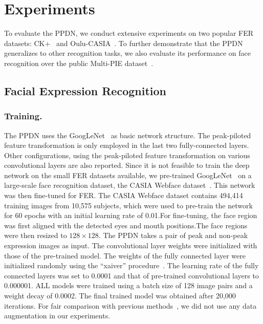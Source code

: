 \documentclass[runningheads]{llncs}
\begin{document}
\section{Experiments}

To evaluate the PPDN, we conduct extensive experiments on two popular 
FER datasets: CK+~\cite{lucey2010extended} and 
Oulu-CASIA~\cite{zhao2011facial}. To further demonstrate that the PPDN
generalizes to other recognition tasks, we also evaluate its performance
on face recognition over the public Multi-PIE 
dataset~\cite{gross2010multi}.

\subsection{Facial Expression Recognition}
\subsubsection{Training.} The PPDN uses the GoogLeNet~\cite{szegedy2015going} 
as basic network structure. The peak-piloted feature transformation is only 
employed in the last two fully-connected layers. Other configurations,
using the peak-piloted feature transformation on various convolutional 
layers are also reported. Since it is not feasible to train the deep network 
on the small FER datasets available, we pre-trained 
GoogLeNet~\cite{szegedy2015going} on a large-scale face recognition dataset,  
the CASIA Webface dataset~\cite{yi2014learning}. This network was then 
fine-tuned for FER. The CASIA Webface dataset contains 494,414 training 
images from 10,575 subjects, which were used to pre-train the network 
for 60 epochs with an initial learning rate of 0.01.For fine-tuning, the face region 
was first aligned with the detected eyes and mouth positions.The face regions 
were then resized to $128 \times 128$. The PPDN takes a pair of peak and 
non-peak expression images as input. The convolutional layer weights
were initialized with those of the pre-trained model. The weights of the 
fully connected layer were initialized randomly using the 
``xaiver'' procedure~\cite{glorot2010understanding}. The learning rate of 
the fully connected layers was set to 0.0001 and that of pre-trained 
convolutional layers to 0.000001.  ALL models were trained 
using a batch size of 128 image pairs and a weight 
decay of 0.0002. The final trained model was obtained after 20,000 
iterations. For fair comparison with previous 
methods~\cite{zhong2012learning,shan2009facial,liu2014facial}, we did not 
use any data augmentation in our experiments. 
\end{document}
